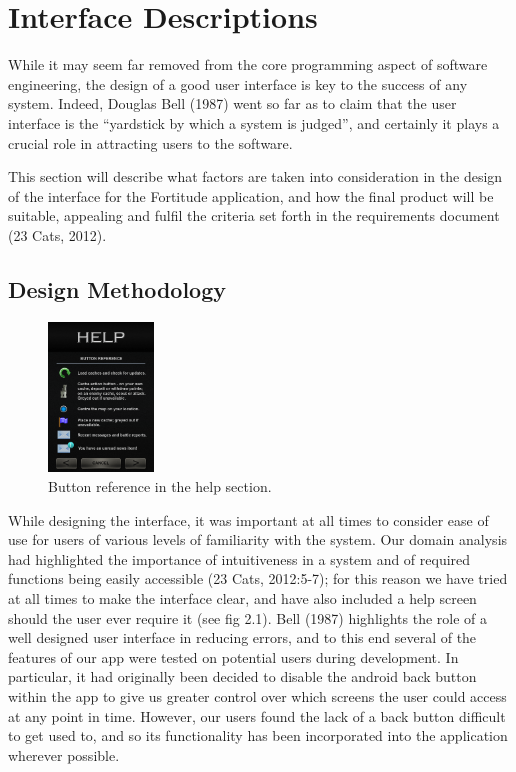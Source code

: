 \section{Interface Descriptions}
While it may seem far removed from the core programming aspect of software engineering, the design of a good user interface is key to the success of any system. Indeed, Douglas Bell (1987) went so far as to claim that the user interface is the ``yardstick by which a system is judged'', and certainly it plays a crucial role in attracting users to the software.

This section will describe what factors are taken into consideration in the design of the interface for the Fortitude application, and how the final product will be suitable, appealing and fulfil the criteria set forth in the requirements document (23 Cats, 2012).

\subsection{Design Methodology}

\begin{figure}
	\vspace{-20pt}
	\begin{center}
	\includegraphics[width=0.25\textwidth]{images/help_mockup}
	\caption{Button reference in the help section.}
	\end{center}
	\vspace{20pt}
\end{figure}

While designing the interface, it was important at all times to consider ease of use for users of various levels of familiarity with the system. Our domain analysis had highlighted the importance of intuitiveness in a system and of required functions being easily accessible (23 Cats, 2012:5-7); for this reason we have tried at all times to make the interface clear, and have also included a help screen should the user ever require it (see fig 2.1). Bell (1987) highlights the role of a well designed user interface in reducing errors, and to this end several of the features of our app were tested on potential users during development. In particular, it had originally been decided to disable the android back button within the app to give us greater control over which screens the user could access at any point in time. However, our users found the lack of a back button difficult to get used to, and so its functionality has been incorporated into the application wherever possible.

